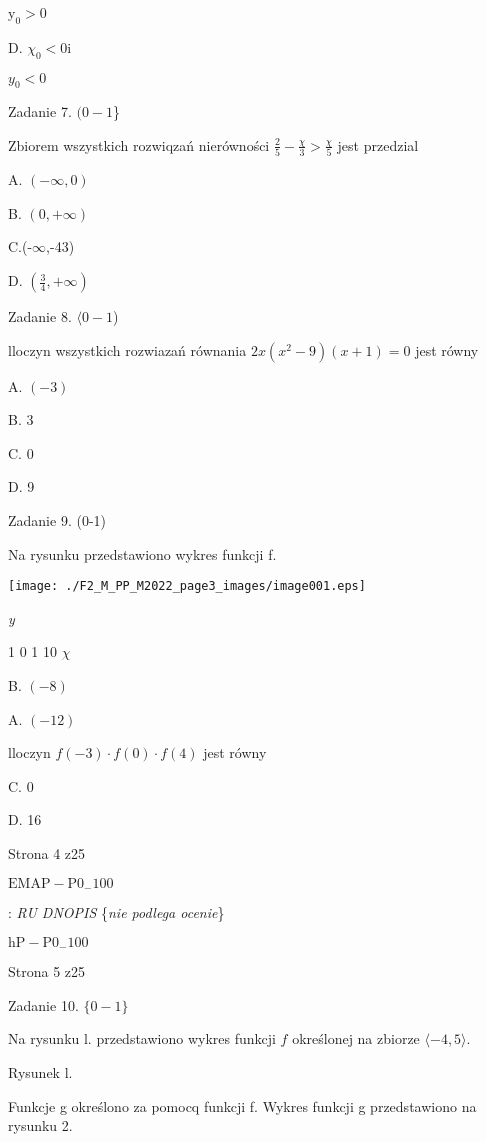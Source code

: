 \documentclass[a4paper,12pt]{article}
\begin{document}
$\mathrm{y}_{0}>0$

D. $\chi_{0}<0 \mathrm{i}$

$y_{0}<0$

Zadanie 7. $(0-1$\}

Zbiorem wszystkich rozwiqzań nierówności $\displaystyle \frac{2}{5}-\frac{\chi}{3}>\frac{\chi}{5}$ jest przedzial

A. $(-\infty,0)$

B. $(0,+\infty)$

C.(-$\infty$,-43)

D. $(\displaystyle \frac{3}{4},+\infty)$

Zadanie 8. $\langle 0-1$)

lloczyn wszystkich rozwiazań równania $2x(x^{2}-9)(x+1)=0$ jest równy

A. $(-3)$

B. 3

C. 0

D. 9

Zadanie 9. (0-1)

Na rysunku przedstawiono wykres funkcji f.
\begin{center}
\texttt{[image: ./F2\_M\_PP\_M2022\_page3\_images/image001.eps]}
\end{center}
{\it y}

1 0  1  10 $\chi$

B. $(-8)$

A. $(-12)$

lloczyn $f(-3)\cdot f(0)\cdot f(4)$ jest równy

C. 0

D. 16

Strona 4 z25

$\mathrm{E}\mathrm{M}\mathrm{A}\mathrm{P}-\mathrm{P}0_{-}100$





: {\it RU DNOPIS} \{{\it nie podlega ocenie}\}

$\mathrm{h}\mathrm{P}-\mathrm{P}0_{-}100$

Strona 5 z25





Zadanie 10. $\{0-1\}$

Na rysunku l. przedstawiono wykres funkcji $f$ określonej na zbiorze $\langle-4, 5\rangle.$

Rysunek l.

Funkcje g określono za pomocq funkcji f. Wykres funkcji g przedstawiono na rysunku 2.
\end{document}

